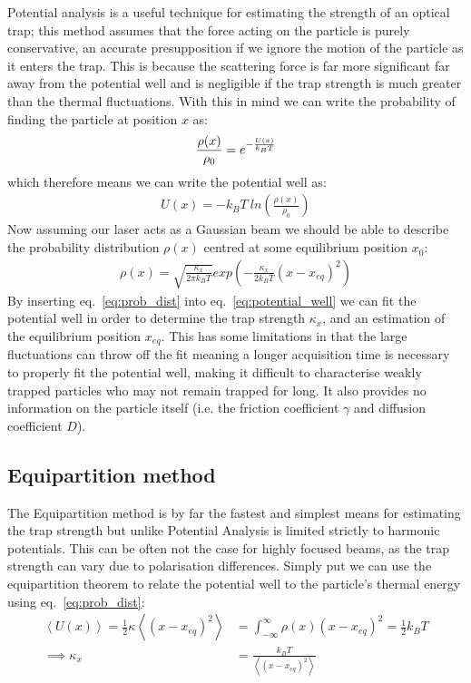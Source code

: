 \documentclass[a4paper,oneside,11pt]{book}
\begin{document}
Potential analysis is a useful technique for estimating the strength of an optical trap; this method assumes that the force acting on the particle is purely conservative, an accurate presupposition if we ignore the motion of the particle as it enters the trap. This is because the scattering force is far more significant far away from the potential well and is negligible if the trap strength is much greater than the thermal fluctuations. With this in mind we can write the probability of finding the particle at position $x$ as:
\begin{align}
	\frac{\rho(x)}{\rho_0} = e^{-\frac{U(x)}{k_{\small{B}}T}} 
\end{align}
which therefore means we can write the potential well as:
\begin{align}
	\label{eq:potential_well}
	U(x)=-k_BT\ ln\left(\frac{\rho(x)}{\rho_0} \right)
\end{align}
Now assuming our laser acts as a Gaussian beam we should be able to describe the probability distribution $\rho(x)$ centred at some equilibrium position $x_0$:
\begin{align}
	\label{eq:prob_dist}
	\rho(x)= \sqrt{\frac{\kappa_x}{2\pi k_BT}}exp\left(-\frac{\kappa_x}{2k_BT}(x-x_{eq})^2\right)
\end{align}
By inserting eq.~\ref{eq:prob_dist} into eq.~\ref{eq:potential_well} we can fit the potential well in order to determine the trap strength $\kappa_x$, and an estimation of the equilibrium position $x_{eq}$. This has some limitations in that the large fluctuations can throw off the fit meaning a longer acquisition time is necessary to properly fit the potential well, making it difficult to characterise weakly trapped particles who may not remain trapped for long. It also provides no information on the particle itself (i.e. the friction coefficient $\gamma$ and diffusion coefficient $D$).

\subsection{Equipartition method}
The Equipartition method is by far the fastest and simplest means for estimating the trap strength but unlike Potential Analysis is limited strictly to harmonic potentials. This can be often not the case for highly focused beams, as the trap strength can vary due to polarisation differences. Simply put we can use the equipartition theorem to relate the potential well to the particle's thermal energy using eq.~\ref{eq:prob_dist}:
\begin{align}
	\left<U(x)\right> = \frac{1}{2}\kappa\left<(x-x_{eq})^2\right> &= \int_{-\infty}^{\infty}\rho(x)(x-x_{eq})^2 = \frac{1}{2}k_BT \\
	\implies \kappa_x &= \frac{k_BT}{\left<(x-x_{eq})^2\right>} 
\end{align}
\end{document}
